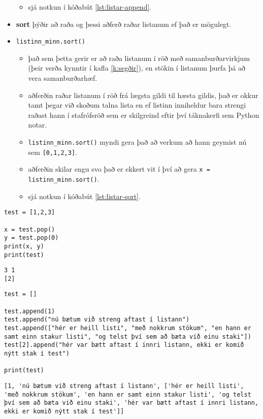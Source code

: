\begin{itemize}[]
\begin{itemize}
		\item sjá notkun í kóðabút \ref{lst:listar-append}.
	\end{itemize}
	\vspace{0.4cm}
	\item \textbf{sort} þýðir að raða og þessi aðferð raðar listanum ef það er mögulegt.
	\item[] \texttt{listinn\_minn.sort()}
	\begin{itemize}
		\item það sem þetta gerir er að raða listanum í röð með samanburðarvirkjum (þeir verða kynntir í kafla \ref{k:segðir}), en stökin í listanum þurfa þá að vera samanburðarhæf.
		\item aðferðin raðar listanum í röð frá lægsta gildi til hæsta gildis, það er okkur tamt þegar við skoðum talna lista  en ef listinn inniheldur bara strengi raðast hann í stafrófsröð sem er skilgreind eftir því táknakerfi sem Python notar.
		\item \texttt{listinn\_minn.sort()} myndi gera það að verkum að hann geymist nú sem \texttt{[0,1,2,3]}.
		\item aðferðin skilar engu svo það er ekkert vit í því að gera \texttt{x = listinn\_minn.sort()}.
		\item sjá notkun í kóðabút \ref{lst:listar-sort}.
	\end{itemize}
	
\end{itemize}

\begin{lstlisting}[caption=.pop() aðferðin, label=lst:listar-pop]
test = [1,2,3]

x = test.pop()
y = test.pop(0)
print(x, y)
print(test)
\end{lstlisting}
\lstset{style=uttak}
\begin{lstlisting}
3 1
[2]
\end{lstlisting}
\lstset{style=venjulegt}

\begin{lstlisting}[caption=.append() aðferðin, label=lst:listar-append]
test = []

test.append(1)
test.append("nú bætum við streng aftast í listann")
test.append(["hér er heill listi", "með nokkrum stökum", "en hann er samt einn stakur listi", "og telst því sem að bæta við einu staki"])
test[2].append("hér var bætt aftast í innri listann, ekki er komið nýtt stak í test")

print(test)
\end{lstlisting}
\lstset{style=uttak}
\begin{lstlisting}
[1, 'nú bætum við streng aftast í listann', ['hér er heill listi', 'með nokkrum stökum', 'en hann er samt einn stakur listi', 'og telst því sem að bæta við einu staki', 'hér var bætt aftast í innri listann, ekki er komið nýtt stak í test']]
\end{lstlisting}
\lstset{style=venjulegt}

